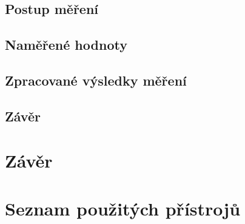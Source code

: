 \documentclass{protokol}
\begin{document}
    \subsection{Postup měření}
    \subsection{Naměřené hodnoty}   
    \subsection{Zpracované výsledky měření}
    \subsection{Závěr}

\pagebreak

\section{Závěr}
    \cite{navod}

\pagebreak


\section{Seznam použitých přístrojů}

\pagebreak


\end{document}
